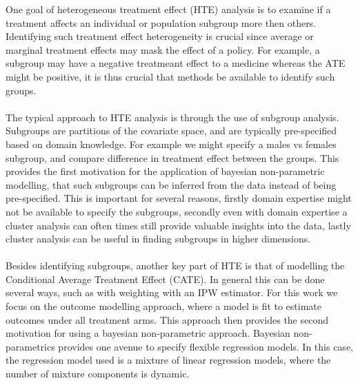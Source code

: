 \documentclass{article}
\begin{document}
One goal of heterogeneous treatment effect (HTE) analysis is to examine if a treatment affects an individual or population subgroup more then others. Identifying such treatment effect heterogeneity is crucial since average or marginal treatment effects may mask the effect of a policy. For example, a subgroup may have a negative treatmeant effect to a medicine whereas the ATE might be positive, it is thus crucial that methods be available to identify such groups. 
\\ \\
The typical approach to HTE analysis is through the use of subgroup analysis. Subgroups are partitions of the covariate space, and are typically pre-specified based on domain knowledge. For example we might specify a males vs females subgroup, and compare difference in treatment effect between the groups. This provides the first motivation for the application of bayesian non-parametric modelling, that such subgroups can be inferred from the data instead of being pre-specified. This is important for several reasons, firstly domain expertise might not be available to specify the subgroups, secondly even with domain expertise a cluster analysis can often times still provide valuable insights into the data, lastly cluster analysis can be useful in finding subgroups in higher dimensions.
\\ \\ 
Besides identifying subgroups, another key part of HTE is that of modelling the Conditional Average Treatment Effect (CATE). In general this can be done several ways, such as with weighting with an IPW estimator. For this work we focus on the outcome modelling approach, where a model is fit to estimate outcomes under all treatment arms. This approach then provides the second motivation for using a bayesian non-parametric approach. Bayesian non-parametrics provides one avenue to specify flexible regression models. In this case, the regression model used is a mixture of linear regression models, where the number of mixture components is dynamic. 
\\ \\
\end{document}
